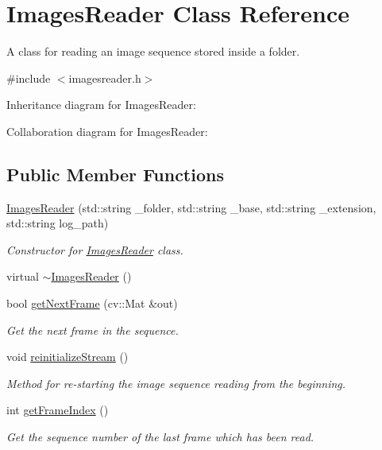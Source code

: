 \hypertarget{classImagesReader}{}\section{Images\+Reader Class Reference}
\label{classImagesReader}


A class for reading an image sequence stored inside a folder.  




{\ttfamily \#include $<$imagesreader.\+h$>$}



Inheritance diagram for Images\+Reader\+:


Collaboration diagram for Images\+Reader\+:
\subsection*{Public Member Functions}
\begin{DoxyCompactItemize}
\item 
\hyperlink{classImagesReader_a66aac81ae2489d91131e23beb63c8b74}{Images\+Reader} (std\+::string \+\_\+folder, std\+::string \+\_\+base, std\+::string \+\_\+extension, std\+::string log\+\_\+path)
\begin{DoxyCompactList}\small\item\em Constructor for \hyperlink{classImagesReader}{Images\+Reader} class. \end{DoxyCompactList}\item 
virtual \hyperlink{classImagesReader_a4a63d54e2fa19c800db7c383e8570dbd}{$\sim$\+Images\+Reader} ()
\item 
bool \hyperlink{classImagesReader_a3fcbb1229da2f0cbb068b46b3b766fa5}{get\+Next\+Frame} (cv\+::\+Mat \&out)
\begin{DoxyCompactList}\small\item\em Get the next frame in the sequence. \end{DoxyCompactList}\item 
void \hyperlink{classImagesReader_a0b9527a0e9cb70b8ae1006208d715826}{reinitialize\+Stream} ()
\begin{DoxyCompactList}\small\item\em Method for re-\/starting the image sequence reading from the beginning. \end{DoxyCompactList}\item 
int \hyperlink{classImagesReader_ab5af03f18a9a0d85244922fa8b1dad4a}{get\+Frame\+Index} ()
\begin{DoxyCompactList}\small\item\em Get the sequence number of the last frame which has been read. \end{DoxyCompactList}\end{DoxyCompactItemize}


